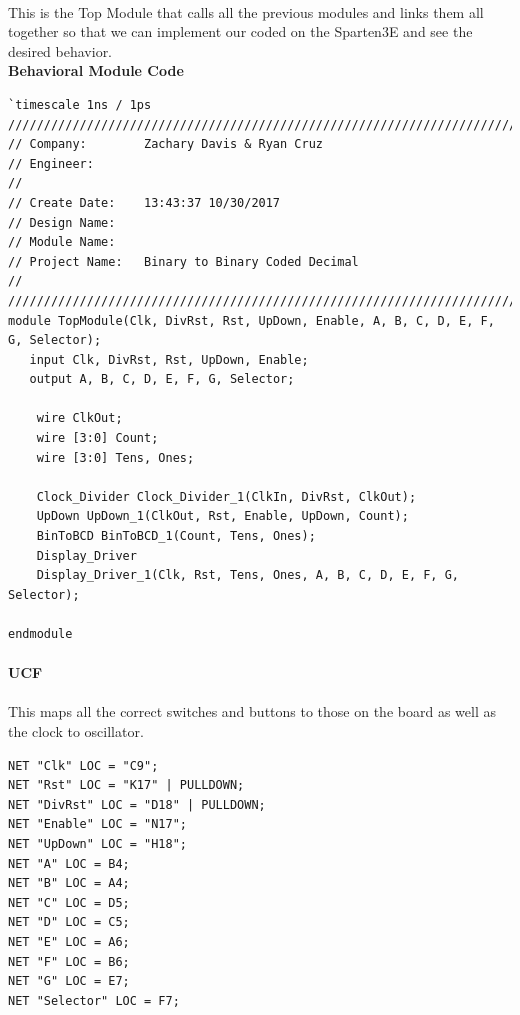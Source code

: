\documentclass[12pt]{report}
\begin{document}
	\paragraph*{}
	This is the Top Module that calls all the previous modules and links them all together so that we can implement our coded on the Sparten3E and see the desired behavior.
	\vspace{0.3cm}\\
	\textbf{Behavioral Module Code}

			\begin{Verbatim}[frame=single, fontsize=\small]
`timescale 1ns / 1ps
////////////////////////////////////////////////////////////////////////////////
// Company:        Zachary Davis & Ryan Cruz
// Engineer: 
// 
// Create Date:    13:43:37 10/30/2017 
// Design Name: 
// Module Name:    
// Project Name:   Binary to Binary Coded Decimal
//
////////////////////////////////////////////////////////////////////////////////
module TopModule(Clk, DivRst, Rst, UpDown, Enable, A, B, C, D, E, F, G, Selector);
   input Clk, DivRst, Rst, UpDown, Enable;
   output A, B, C, D, E, F, G, Selector;
	
	wire ClkOut;
	wire [3:0] Count;
	wire [3:0] Tens, Ones;
	
	Clock_Divider Clock_Divider_1(ClkIn, DivRst, ClkOut);
	UpDown UpDown_1(ClkOut, Rst, Enable, UpDown, Count);
	BinToBCD BinToBCD_1(Count, Tens, Ones);
	Display_Driver 
	Display_Driver_1(Clk, Rst, Tens, Ones, A, B, C, D, E, F, G, Selector);

endmodule
			\end{Verbatim}
		\paragraph*{}
			
		\vspace{4cm}
	\textbf{UCF}
	\vspace{0cm}\\
	\paragraph*{}
	This maps all the correct switches and buttons to those on the board as well as the clock to oscillator.
			\begin{Verbatim}[frame=single, fontsize=\small]
NET "Clk" LOC = "C9";
NET "Rst" LOC = "K17" | PULLDOWN;
NET "DivRst" LOC = "D18" | PULLDOWN;
NET "Enable" LOC = "N17";
NET "UpDown" LOC = "H18";
NET "A" LOC = B4;
NET "B" LOC = A4;
NET "C" LOC = D5;
NET "D" LOC = C5;
NET "E" LOC = A6;
NET "F" LOC = B6;
NET "G" LOC = E7;
NET "Selector" LOC = F7;
			\end{Verbatim}
\end{document}
